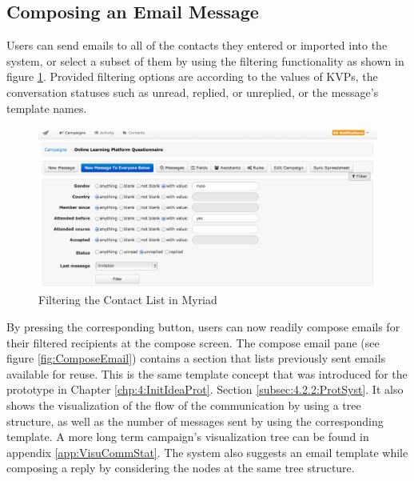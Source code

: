\clearpage

\subsection{Composing an Email Message}
\label{subsec:5.2.4:CompEmaiMess}

Users can send emails to all of the contacts they entered or imported into the system, or select a subset of them by using the filtering functionality as shown in figure \ref{fig:ContactFilters}. Provided filtering options are according to the values of \ac{KVP}s, the conversation statuses such as unread, replied, or unreplied, or the message's template names.

\begin{figure}[htbp]
	\centering
	\includegraphics[width=1.00\textwidth]{imgs/ContactFilters.png}
	\caption[Filtering the Contact List in Myriad]{Filtering the Contact List in Myriad}
	\label{fig:ContactFilters}
\end{figure}

By pressing the corresponding button, users can now readily compose emails for their filtered recipients at the compose screen. The compose email pane (see figure \ref{fig:ComposeEmail}) contains a section that lists previously sent emails available for reuse. This is the same template concept that was introduced for the prototype in Chapter \ref{chp:4:InitIdeaProt}. Section \ref{subsec:4.2.2:ProtSyst}. It also shows the visualization of the flow of the communication by using a tree structure, as well as the number of messages sent by using the corresponding template. A more long term campaign's visualization tree can be found in appendix \ref{app:VisuCommStat}. The system also suggests an email template while composing a reply by considering the nodes at the same tree structure.

